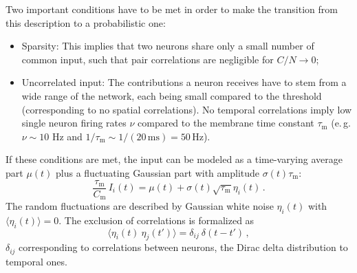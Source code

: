 Two important conditions have to be met in order to make the transition from 
this description to a probabilistic one:
\begin{itemize}
    \item Sparsity: This implies that 
        two neurons share only a small number of common input, such that pair correlations
        are negligible for $C / N \to 0$; 
    \item Uncorrelated input: The contributions a neuron receives have to stem from 
        a wide range of the network, each being small compared to the threshold
        (corresponding to no spatial correlations). 
        No temporal correlations imply low single neuron firing rates $\nu$ compared 
        to the membrane time constant $\tau_\text{m}$
        (e.\,g. $\nu \sim10$ Hz and $1 / \tau_\text{m} \sim 1 / (20\,\text{ms}) = 50\, \text{Hz}$).
\end{itemize}
If these conditions are met, the input can be modeled as a time-varying average part
$\mu(t)$ plus a fluctuating Gaussian part with amplitude $\sigma(t)\tau_\text{m}$:
\begin{equation}
    \frac{\tau_\text{m}}{C_\text{m}} \, I_i(t) =  \mu(t) + \sigma(t) \sqrt{\tau_\text{m}} \eta_i(t) \, .
    \label{eq:input_random}
\end{equation}
The random fluctuations are described by Gaussian white noise $\eta_i(t)$ with 
$\langle  \eta_i(t)\rangle = 0$. 
The exclusion of correlations is formalized as  
\begin{equation}
    \langle \eta_i(t) \: \eta_j(t') \rangle = \delta_{ij} \: \delta(t - t')	\, ,
    \label{eq:no_correlations}
\end{equation}
$\delta_{ij}$ corresponding to correlations between neurons, 
the Dirac delta distribution to temporal ones. 

